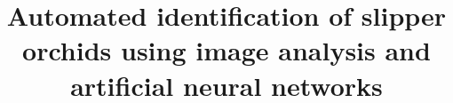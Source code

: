 \documentclass[twocolumn]{bmcart}
\begin{document}
\hypersetup{
    citecolor=blue,
    filecolor=blue,
    linkcolor=blue,
    urlcolor=blue
}

\begin{frontmatter}

\begin{fmbox}


\title{Automated identification of slipper orchids using image analysis and artificial neural networks}


\author[
   addressref={nbc},
]{ }
\author[
   addressref={nbc,hsl,lu},
   noteref={n1},
]{ }
\author[
   addressref={nbc},
]{ }
\author[
   addressref={nbc},
]{ }



\address[id=nbc]{
  ,
}


\end{fmbox}
\end{frontmatter}
\end{document}
